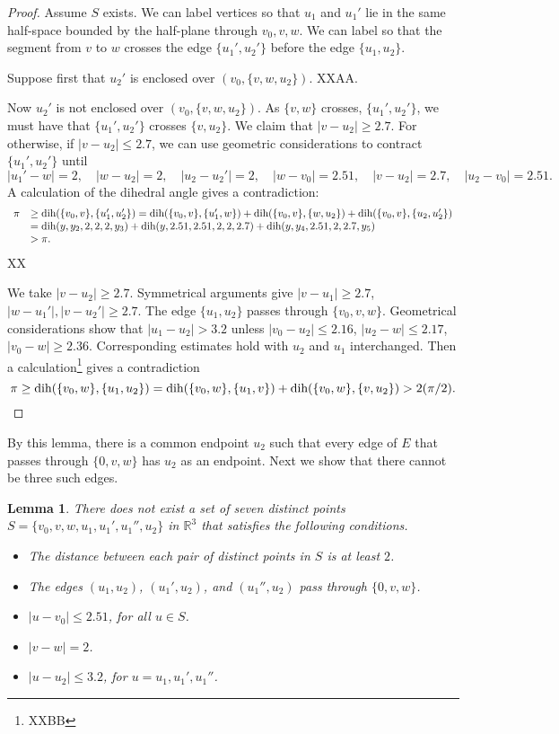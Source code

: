 \documentclass[11pt]{amsart}
\def\op#1{{\text{#1}}}
\newcommand{\ring}[1]{\mathbb{#1}}
\def\dih{\op{dih}}
\def\text{\hbox}
\newtheorem{lemma}[subsubsection]{Lemma}
\begin{document}
\begin{proof}
Assume $S$ exists.  We can label vertices so that $u_1$ and $u_1'$ lie in the same half-space bounded by
the half-plane through $v_0,v,w$.   We can label so that the segment from $v$ to $w$ crosses the edge $\{u_1',u_2'\}$
before the edge $\{u_1,u_2\}$.

Suppose first that $u_2'$ is enclosed over $(v_0,\{v,w,u_2\})$. XXAA.

Now $u_2'$ is not enclosed over $(v_0,\{v,w,u_2\})$.  As $\{v,w\}$ crosses, $\{u_1',u_2'\}$, we must
have that $\{u_1',u_2'\}$ crosses $\{v,u_2\}$.  We claim that $|v-u_2|\ge 2.7$.  For otherwise,
if $|v-u_2|\le 2.7$, we can use geometric considerations to contract $\{u_1',u_2'\}$ until
$$
|u_1'-w|=2,\quad |w-u_2|=2,\quad |u_2-u_2'|=2,\quad |w-v_0|=2.51,\quad |v-u_2|=2.7,\quad |u_2-v_0|=2.51.
$$
A calculation of the dihedral angle gives a contradiction:
$$
\begin{array}{lll}
\pi &\ge\op{dih}(\{v_0,v\},\{u_1',u_2'\}) = \op{dih}(\{v_0,v\},\{u_1',w\})+\op{dih}(\{v_0,v\},\{w,u_2\})+\op{dih}(\{v_0,v\},\{u_2,u_2'\})\\
&=\dih(y,y_2,2,2,2,y_3)+\dih(y,2.51,2.51,2,2,2.7)+\dih(y,y_4,2.51,2,2.7,y_5) \\
  &>\pi.
\end{array}
$$
XX

We take $|v-u_2|\ge 2.7$.  Symmetrical arguments give $|v-u_1|\ge 2.7$, $|w-u_1'|,|v-u_2'|\ge 2.7$.
The edge $\{u_1,u_2\}$ passes through $\{v_0,v,w\}$.  Geometrical considerations show that $|u_1-u_2|>3.2$
unless $|v_0-u_2|\le 2.16$, $|u_2-w|\le 2.17$, $|v_0-w|\ge 2.36$.  Corresponding estimates  hold with
$u_2$ and $u_1$ interchanged.  Then a calculation\footnote{XXBB} gives a contradiction
$$
\pi \ge \op{dih}(\{v_0,w\},\{u_1,u_2\}) = \op{dih}(\{v_0,w\},\{u_1,v\}) + \op{dih}(\{v_0,w\},\{v,u_2\}) >
2 (\pi/2).
$$
\end{proof}

By this lemma, there is a common endpoint $u_2$ such that every edge
of $E$ that passes through $\{0,v,w\}$ has $u_2$ as an endpoint.
Next we show that there cannot be three such edges.

\begin{lemma}
There does not exist a set of seven distinct points
$S=\{v_0,v,w,u_1,u_1',u_1'',u_2\}$ in $\ring{R}^3$ that satisfies
the following conditions.
\begin{itemize}
\item The distance between each pair of distinct points in $S$ is at least $2$.
\item The edges $(u_1,u_2)$, $(u_1',u_2)$, and $(u_1'',u_2)$ pass through
$\{0,v,w\}$.
\item $|u-v_0|\le 2.51$, for all $u\in S$.
\item $|v-w|=2$.
\item $|u-u_2|\le 3.2$, for $u=u_1,u_1',u_1''$.
\end{itemize}
\end{lemma}
\end{document}

